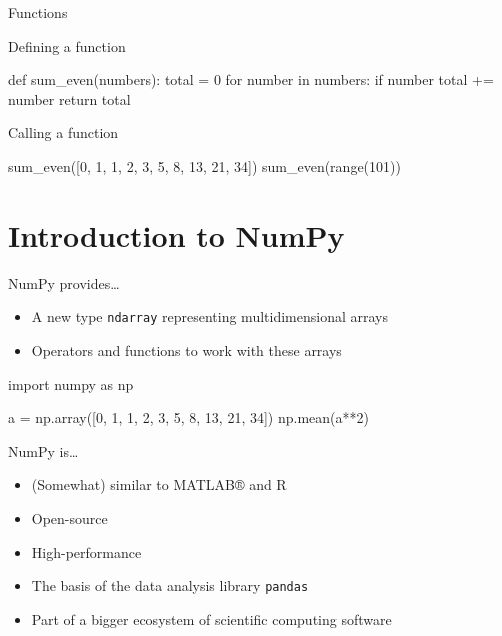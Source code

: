 \begin{frame}[fragile]{Functions}
    \vspace{0.5em}
    \begin{block}{Defining a function}
        \begin{py3}
            def sum_even(numbers):
                total = 0
                for number in numbers:
                    if number %
                        total += number
                return total
        \end{py3}
    \end{block}
    \vspace{-0.75em}
    \begin{block}{Calling a function}
        \begin{py3}
            sum_even([0, 1, 1, 2, 3, 5, 8, 13, 21, 34])
            sum_even(range(101))
        \end{py3}
    \end{block}
\end{frame}

\section{Introduction to NumPy}

\begin{frame}[fragile]{NumPy provides\ldots}
    \begin{itemize}
        \item A new type \texttt{ndarray} representing
              multidimensional arrays
        \item Operators and functions to work with these arrays
    \end{itemize}
    \vfill
    \begin{py3}
        import numpy as np

        a = np.array([0, 1, 1, 2, 3, 5, 8, 13, 21, 34])
        np.mean(a**2)
    \end{py3}
\end{frame}

\begin{frame}{NumPy is\ldots}
    \begin{itemize}
        \setlength{\itemsep}{0.75em}
        \item (Somewhat) similar to MATLAB® and R
        \item Open\hyp{}source
        \item High\hyp{}performance
        \item The basis of the data analysis library \texttt{pandas}
        \item Part of a bigger ecosystem of scientific computing software
    \end{itemize}
\end{frame}




